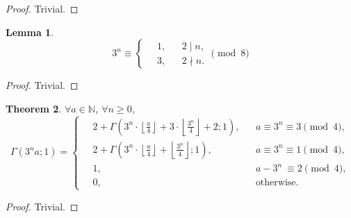 \documentclass[a4paper,12pt]{article}
\theoremstyle{sltheorem}
\newtheorem{conjecture}{Conjecture}
\newtheorem{theorem}{Theorem}
\newtheorem{lemma}[theorem]{Lemma}
\newcommand{\floor}[1]{\left\lfloor#1\right\rfloor}
\begin{document}
\begin{proof} Trivial. \end{proof}
\begin{lemma}
    \[3^n \equiv \left\{\ \begin{aligned}
        & 1,   & & 2 \mid n, \\
        & 3,   & & 2\nmid n.
    \end{aligned}\right. \pmod{8} \]
\end{lemma}
\begin{proof} Trivial. \end{proof}
\begin{theorem}
    $\forall a \in \mathbb{N}$, $\forall n \ge 0$,
    \[\Gamma(3^{n}a;1) = \left\{\ \begin{aligned}
        & 2 + \Gamma(3^{n}\cdot\floor{\frac{a}{4}}+3\cdot\floor{\frac{3^n}{4}}+2;1),  & & a \equiv 3^n \equiv 3 \pmod{4}, \\
        & 2 + \Gamma(3^{n}\cdot\floor{\frac{a}{4}}+\floor{\frac{3^n}{4}};1),  & & a \equiv 3^n \equiv 1 \pmod{4}, \\
        & 1,                & & a - 3^n\ \equiv 2 \pmod{4}, \\
        & 0,                & & \text{otherwise} .
    \end{aligned}\right.\]
\end{theorem}
\begin{proof} Trivial. \end{proof}


\nocite{*}
\end{document}
